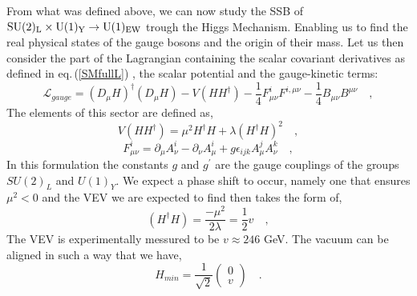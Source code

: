 

From what was defined above, we can now study the SSB of ${\mathrm{SU}(2)_{\mathrm{L}}\times\mathrm{U}(1)_{\mathrm{Y}} \rightarrow \mathrm{U}(1)_{\mathrm{EW}}}$ trough the Higgs Mechanism. Enabling us to find the real physical states of the gauge bosons and the origin of their mass. Let us then consider the part of the Lagrangian containing the scalar covariant derivatives as defined in eq.\,(\ref{SMfullL}) , the scalar potential and the gauge-kinetic terms:
%
\begin{equation}
\mathcal{L}_{gauge} = (D_\mu H)^\dagger (D_\mu H) - V (H H^\dagger) - \frac{1}{4} F^i_{\mu \nu} F^{i , \mu \nu} - \frac{1}{4} B_{\mu \nu} B^{\mu \nu} \quad , 
\label{iamgarbagemanyes}
\end{equation} 
The elements of this sector are defined as,
\begin{equation}
V(H H^\dagger ) = \mu^2 H^\dagger H + \lambda (H^\dagger H)^2 \quad , 
\end{equation}
\begin{equation}
 F^i_{\mu \nu}= \partial_\mu A^i_\nu - \partial_\nu A^i_\mu + g \epsilon_{ijk} A^j_\mu A^k_\nu  \quad , 
\end{equation}
%
In this formulation the constants $g$ and $g^\prime$ are the gauge couplings of the groups $SU(2)_L$ and $U(1)_Y$. 
% 
We expect a phase shift to occur, namely one that ensures $\mu^2 < 0$ and the VEV we are expected to find then takes the form of,
%
\begin{equation}
(H^\dagger H) = \frac{-\mu^2}{2\lambda} = \frac{1}{2} v  \quad , 
\end{equation} 
The VEV is experimentally messured to be $v \approx 246$ GeV. 
%
The vacuum can be aligned in such a way that we have,
\begin{equation}
H_{min} = \frac{1}{\sqrt{2}} \begin{pmatrix} 0 \\
v 
\end{pmatrix} \quad .
\end{equation}

